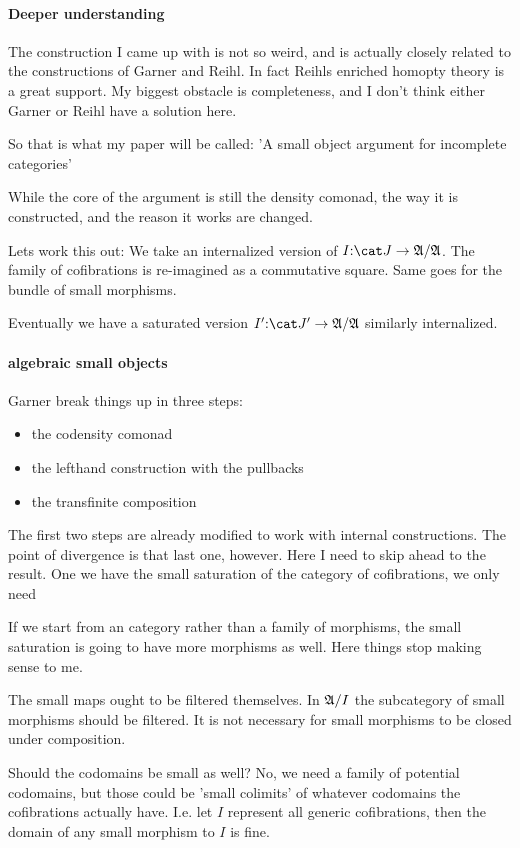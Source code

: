 \documentclass[csh.tex]{subfiles}
\begin{document}
\paragraph{Deeper understanding}
The construction I came up with is not so weird, and is actually closely related to the constructions of Garner and Reihl. In fact Reihls enriched homopty theory is a great support. My biggest obstacle is completeness, and I don't think either Garner or Reihl have a solution here.

So that is what my paper will be called:
'A small object argument for incomplete categories'

While the core of the argument is still the density comonad, the way it is constructed, and the reason it works are changed.

Lets work this out:
We take an internalized version of $I\of \cat J\to\ambient/\ambient$. The family of cofibrations is re-imagined as a commutative square. Same goes for the bundle of small morphisms.

Eventually we have a saturated version $I'\of \cat J'\to\ambient/\ambient$ similarly internalized.

\paragraph{algebraic small objects}

Garner break things up in three steps:
\begin{itemize}
\item the codensity comonad
\item the lefthand construction with the pullbacks
\item the transfinite composition
\end{itemize}

The first two steps are already modified to work with internal constructions.
The point of divergence is that last one, however. Here I need to skip ahead to the result.
One we have the small saturation of the category of cofibrations, we only need 

If we start from an category rather than a family of morphisms, the small saturation is going to have more morphisms as well.
Here things stop making sense to me.

The small maps ought to be filtered themselves. In $\mathfrak A/I$ the subcategory of small morphisms should be filtered. It is not necessary for small morphisms to be closed under composition.

Should the codomains be small as well? No, we need a family of potential codomains, but those could be 'small colimits' of whatever codomains the cofibrations actually have. I.e. let $I$ represent all generic cofibrations, then the domain of any small morphism to $I$ is fine.
\end{document}
